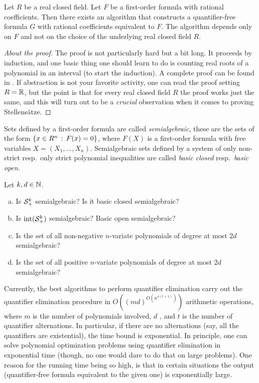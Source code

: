 \begin{theorem} 
	\label{thm:tarski-seidenberg}
	Let $R$ be a real closed field. Let $F$ be a first-order formula with rational coefficients. Then there exists an algorithm that constructs a quantifier-free formula $G$ with rational coefficients equivalent to $F$. The algorithm depends only on $F$ and not on the choice of the underlying real closed field $R$. 
\end{theorem}
\begin{proof}[About the proof]
	The proof is not particularly hard but a bit long. It proceeds by induction, and one basic thing one should learn to do is counting real roots of a polynomial in an interval (to start the induction). A complete proof can be found in \cite[Th.~1.4.6]{Bochnak:Coste:Roy:1998}. If abstraction is not your favorite activity, one can read the proof setting $R=\mathbb{R}$, but the point is that for every real closed field $R$ the proof works just the same, and this will turn out to be a \emph{crucial} observation when it comes to proving Stellensätze. 
\end{proof}

Sets defined by a first-order formula are called \emph{semialgebraic}, these are the sets of the form $\left\{ x \in R^n \,:\, F(x)=0 \right\}$, where $F(X)$ is a first-order formula with free variables $X=(X_1,\ldots,X_n)$. Semialgebraic sets defined by a system of only non-strict resp.\ only strict polynomial inequalities are called \emph{basic closed} resp.\ \emph{basic open}.

\begin{exercise}
	Let $k,d \in \mathbb{N}$. 
	\begin{enumerate}[(a)]
		\item Is $\mathcal{S}_+^k$ semialgebraic? Is it basic closed semialgebraic?
		\item Is $\operatorname{int}(\mathcal{S}_+^k)$ semialgebraic? Basic open semialgebraic?
		\item Is the set of all non-negative $n$-variate polynomials of degree at most $2d$ semialgebraic?
		\item Is the set of all positive $n$-variate polynomials of degree at most $2d$ semialgebraic?
	\end{enumerate}
\end{exercise}

\begin{remark}
	Currently, the best algorithms to perform quantifier elimination carry out the quantifier elimination procedure in $O((m d)^{O(n^{4 (t+1)})})$ arithmetic operations, where $m$ is the number of polynomials involved, $d$ , and $t$ is the number of quantifier alternations. In particular, if there are no alternations (say, all the quantifiers are existential), the time bound is exponential. In principle, one can solve polynomial optimization problems using quantifier elimination in exponential time (though, no one  would dare to do that on large problems). One reason for the running time being so high, is that in certain situations the output (quantifier-free formula equivalent to the given one) is exponentially large. 
\end{remark}

